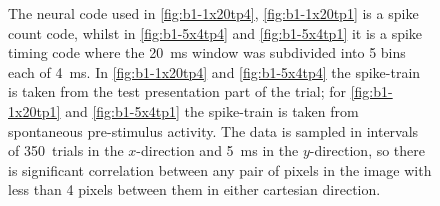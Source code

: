 \begin{figure}[htbp]
{The neural code used in \ref{fig:b1-1x20tp4}, \ref{fig:b1-1x20tp1} is a spike count code, whilst in \ref{fig:b1-5x4tp4} and \ref{fig:b1-5x4tp1} it is a spike timing code where the \SI{20}{ms} window was subdivided into 5 bins each of \SI{4}{ms}.
In \ref{fig:b1-1x20tp4} and \ref{fig:b1-5x4tp4} the spike-train is taken from the test presentation part of the trial;
for \ref{fig:b1-1x20tp1} and \ref{fig:b1-5x4tp1} the spike-train is taken from spontaneous pre-stimulus activity.
The data is sampled in intervals of \SI{350}{trials} in the $x$-direction and \SI{5}{ms} in the $y$-direction, so there is significant correlation between any pair of pixels in the image with less than 4 pixels between them in either cartesian direction.
}
    \label{fig:b1-trialwise}
\end{figure}



